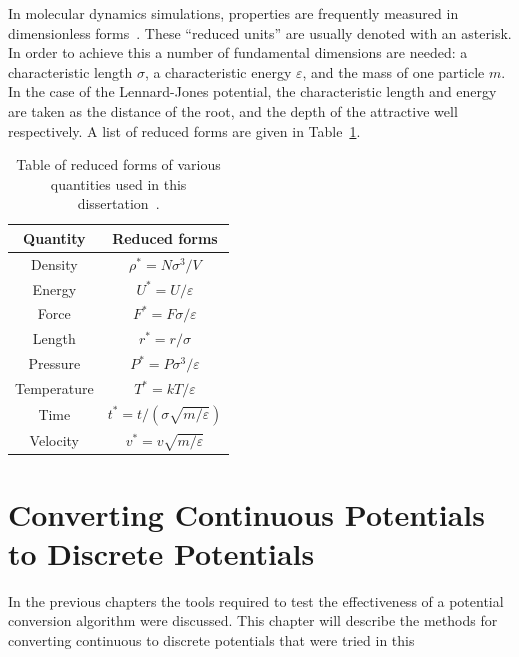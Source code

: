 \documentclass[12pt]{UoAthesis} \usepackage{booktabs}
\begin{document}
In molecular dynamics simulations, properties are frequently measured
in dimensionless forms~\cite{Haile1997}. These ``reduced units'' are
usually denoted with an asterisk.  In order to achieve this a number
of fundamental dimensions are needed: a characteristic length
$\sigma$, a characteristic energy $\varepsilon$, and the mass of one
particle $m$.  In the case of the Lennard-Jones potential, the
characteristic length and energy are taken as the distance of the
root, and the depth of the attractive well respectively. A list of
reduced forms are given in Table~\ref{tab:reducedForms}.
\begin{table}[htp] 
  \caption[Table of reduced quantities]
  {Table of reduced forms of various quantities used in this
    dissertation~\cite{Haile1997}.}
  \label{tab:reducedForms}
  \begin{center}
    \begin{tabular}{c c}
      \toprule
      Quantity & Reduced forms \\
      \midrule
      Density & $\rho^* = N \sigma^3 / V$ \\
      Energy & $U^* = U / \varepsilon$ \\
      Force & $F^* = F\sigma/\varepsilon$ \\
      Length & $r^* = r / \sigma$ \\
      Pressure & $P^* = P \sigma^3 /\varepsilon$ \\
      Temperature & $T^* = kT/\varepsilon$ \\
      Time & $t^* = t / (\sigma \sqrt{m/\varepsilon})$ \\
      Velocity & $v^* = v\sqrt{m/\varepsilon}$ \\
      \bottomrule
    \end{tabular}
  \end{center}
\end{table}


\printbibliography[heading=thesisChapterBib] 

\chapter{Converting Continuous Potentials to Discrete Potentials}
\label{chap:cont2dis}
In the previous chapters the tools required to test the effectiveness
of a potential conversion algorithm were discussed.  This chapter will
describe the methods for converting continuous to discrete potentials
that were tried in this 
\end{document}
